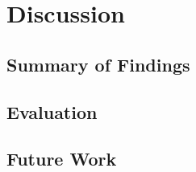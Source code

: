 \chapter{Discussion}
\label{chapterlabel5}
\section{Summary of Findings}
\section{Evaluation}
\section{Future Work}

